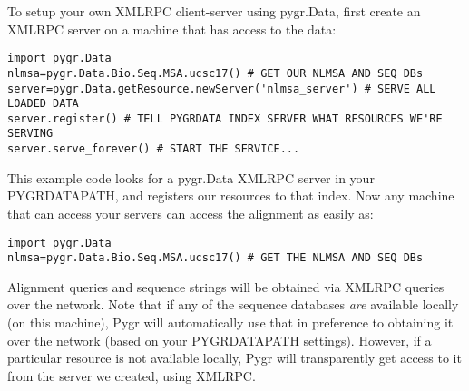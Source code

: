 \documentclass{howto}
\begin{document}
To setup your own XMLRPC client-server using pygr.Data,
first create an XMLRPC server on a machine that
has access to the data:

\begin{verbatim}
import pygr.Data
nlmsa=pygr.Data.Bio.Seq.MSA.ucsc17() # GET OUR NLMSA AND SEQ DBs
server=pygr.Data.getResource.newServer('nlmsa_server') # SERVE ALL LOADED DATA
server.register() # TELL PYGRDATA INDEX SERVER WHAT RESOURCES WE'RE SERVING
server.serve_forever() # START THE SERVICE...
\end{verbatim}

This example code looks for a pygr.Data XMLRPC server in your PYGRDATAPATH,
and registers our resources to that index.  Now any machine that can access
your servers can access the alignment as easily as:
\begin{verbatim}
import pygr.Data
nlmsa=pygr.Data.Bio.Seq.MSA.ucsc17() # GET THE NLMSA AND SEQ DBs
\end{verbatim}
Alignment queries and sequence strings will be obtained via XMLRPC 
queries over the network.  Note that if any of the sequence databases
{\em are} available locally (on this machine), Pygr will automatically use that 
in preference to obtaining it over the network (based on your PYGRDATAPATH
settings).  However, if a particular resource is not available locally,
Pygr will transparently get access to it from the server we created,
using XMLRPC.
\end{document}

